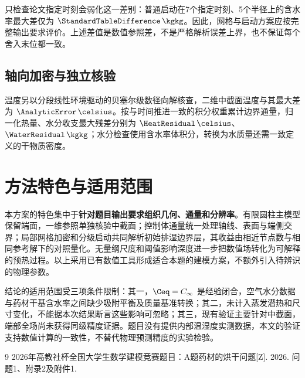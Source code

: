 只检查论文指定时刻会弱化这一差别：普通启动在7个指定时刻、5个半径上的含水率最大差仅为 $\StandardTableDifference\,\kgkg$。因此，网格与启动方案应按完整输出要求评价。上述差值是数值参照差，不是严格解析误差上界，也不保证每个舍入末位都一致。

\subsection{轴向加密与独立核验}

温度另以分段线性环境驱动的贝塞尔级数径向解核查，二维中截面温度与其最大差为 $\AnalyticError\,\celsius$。按与时间推进一致的积分权重累计边界通量，归一化热量、水分收支最大残差分别为 $\HeatResidual\,\celsius$、$\WaterResidual\,\kgkg$；水分检查使用含水率体积分，转换为水质量还需一致定义的干物质密度。

\section{方法特色与适用范围}
本方案的特色集中于\textbf{针对题目输出要求组织几何、通量和分辨率}。有限圆柱主模型保留端面，一维参照单独核验中截面；控制体通量统一处理轴线、表面与端侧交界；局部网格加密和分级启动共同解析初始排湿边界层，其收益由相近节点数与相同参考解下的对照量化。无量纲尺度和阈值影响深度进一步把数值场转化为可解释的预热过程。以上采用已有数值工具形成适合本题的建模方案，不额外引入待辨识的物理参数。

结论的适用范围受三项条件限制：其一，$\Ceq=C_\infty$ 是经验闭合，空气水分数据与药材干基含水率之间缺少吸附平衡及质量基准转换；其二，未计入蒸发潜热和尺寸变化，不能据本次结果断言这些影响可忽略；其三，现有验证主要针对中截面，端部全场尚未获得同级精度证据。题目没有提供内部温湿度实测数据，本文的验证支持数值计算的一致性，不替代物理预测精度的实验检验。

\begin{thebibliography}{9}\small
{} 2026年高教社杯全国大学生数学建模竞赛题目：A题药材的烘干问题[Z]. 2026. 问题1、附录2及附件1.
\end{thebibliography}
